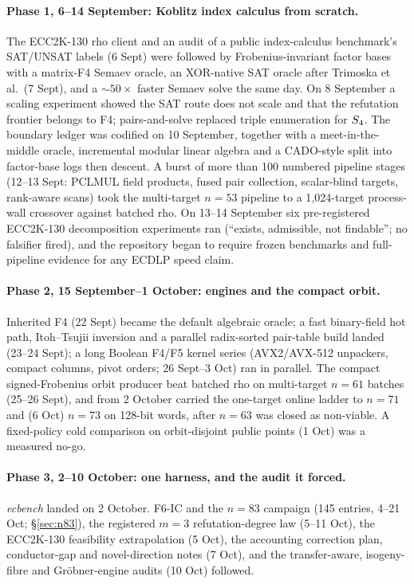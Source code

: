 \paragraph{Phase 1, 6--14 September: Koblitz index calculus from
scratch.} The ECC2K-130 rho client and an audit of a public
index-calculus benchmark's SAT/UNSAT labels (6 Sept) were followed by
Frobenius-invariant factor bases with a matrix-F4 Semaev oracle, an
XOR-native SAT oracle after Trimoska et al.\ (7 Sept), and a $\sim50\times$
faster Semaev solve the same day. On 8 September a scaling experiment
showed the SAT route does not scale and that the refutation frontier
belongs to F4; pairs-and-solve replaced triple enumeration for
$S_{4}$. The boundary ledger was codified on 10 September, together with
a meet-in-the-middle oracle, incremental modular linear algebra and a
CADO-style split into factor-base logs then descent. A burst of more than
100 numbered pipeline stages (12--13 Sept: PCLMUL field products, fused
pair collection, scalar-blind targets, rank-aware scans) took the
multi-target $n=53$ pipeline to a 1{,}024-target process-wall crossover
against batched rho. On 13--14 September six pre-registered ECC2K-130
decomposition experiments ran (``exists, admissible, not findable''; no
falsifier fired), and the repository began to require frozen benchmarks
and full-pipeline evidence for any ECDLP speed claim.

\paragraph{Phase 2, 15 September--1 October: engines and the compact
orbit.} Inherited F4 (22 Sept) became the default algebraic oracle; a fast
binary-field hot path, Itoh--Tsujii inversion and a parallel radix-sorted
pair-table build landed (23--24 Sept); a long Boolean F4/F5 kernel series
(AVX2/AVX-512 unpackers, compact columns, pivot orders; 26 Sept--3 Oct)
ran in parallel. The compact signed-Frobenius orbit producer beat batched rho on
multi-target $n=61$ batches (25--26 Sept), and from 2 October carried the
one-target online ladder to $n=71$ and (6 Oct) $n=73$ on 128-bit words,
after $n=63$ was closed as non-viable. A fixed-policy
cold comparison on orbit-disjoint public points (1 Oct) was a measured
no-go.

\paragraph{Phase 3, 2--10 October: one harness, and the audit it
forced.} \emph{ecbench} landed on 2 October. F6-IC and the $n=83$
campaign (145 entries, 4--21 Oct; \S\ref{sec:n83}), the registered $m=3$ refutation-degree law (5--11
Oct), the ECC2K-130 feasibility extrapolation (5 Oct), the accounting
correction plan, conductor-gap and novel-direction notes (7 Oct), and the
transfer-aware, isogeny-fibre and Gr\"obner-engine audits (10 Oct)
followed.

